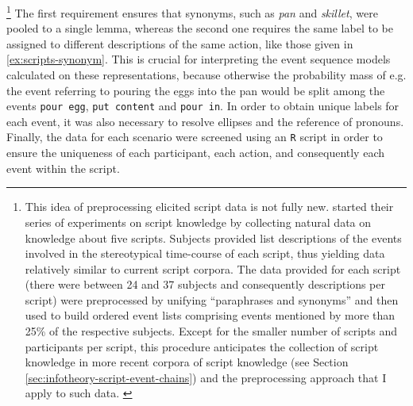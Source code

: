 %
\footnote{This idea of preprocessing elicited script data is not fully new. \citet{bower.etal1979} started their series of experiments on script knowledge by collecting natural data on knowledge about five scripts. Subjects provided list descriptions of the events involved in the stereotypical time-course of each script, thus yielding data relatively similar to current script corpora. The data provided for each script (there were between 24 and 37 subjects and consequently descriptions per script) were preprocessed by unifying ``paraphrases and synonyms'' \citep[181]{bower.etal1979} and then used to build ordered event lists comprising events mentioned by more than 25\% of the respective subjects. Except for the smaller number of scripts and participants per script, this procedure anticipates the collection of script knowledge in more recent corpora of script knowledge (see Section \ref{sec:infotheory-script-event-chains}) and the preprocessing approach that I apply to such data.%
\label{fn:bower-etal-ex1}}\afterfn%
%
The first requirement ensures that synonyms, such as \textit{pan} and \textit{skillet}, were pooled to a single lemma, whereas the second one requires the same label to be assigned to different descriptions of the same action, like those given in \ref{ex:scripts-synonym}. This is crucial for interpreting the event sequence models calculated on these representations, because otherwise the probability mass of e.g. the event referring to pouring the eggs into the pan would be split among the events \texttt{pour egg}, \texttt{put content} and \texttt{pour in}. In order to obtain unique labels for each event, it was also necessary to resolve ellipses and the reference of pronouns. Finally, the data for each scenario were screened using an \texttt{R} script in order to ensure the uniqueness of each participant, each action, and consequently each event within the script.

